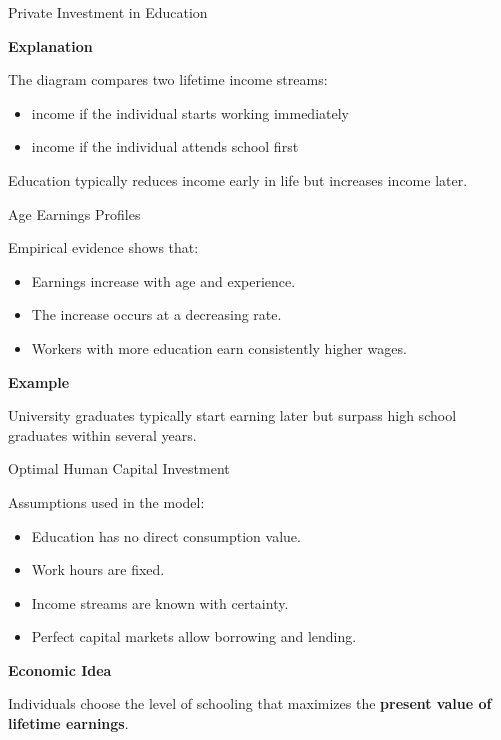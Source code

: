 \documentclass[aspectratio=169]{beamer}
\begin{document}
\begin{frame}{Private Investment in Education}

\begin{center}
\end{center}

\textbf{Explanation}

The diagram compares two lifetime income streams:

\begin{itemize}
\item income if the individual starts working immediately
\item income if the individual attends school first
\end{itemize}

Education typically reduces income early in life but increases income later.
\end{frame}

\begin{frame}{Age Earnings Profiles}

Empirical evidence shows that:

\begin{itemize}
\item Earnings increase with age and experience.
\item The increase occurs at a decreasing rate.
\item Workers with more education earn consistently higher wages.
\end{itemize}

\textbf{Example}

University graduates typically start earning later but surpass high school graduates within several years.
\end{frame}

\begin{frame}{Optimal Human Capital Investment}

Assumptions used in the model:

\begin{itemize}
\item Education has no direct consumption value.
\item Work hours are fixed.
\item Income streams are known with certainty.
\item Perfect capital markets allow borrowing and lending.
\end{itemize}

\textbf{Economic Idea}

Individuals choose the level of schooling that maximizes the \textbf{present value of lifetime earnings}.
\end{frame}
\end{document}
